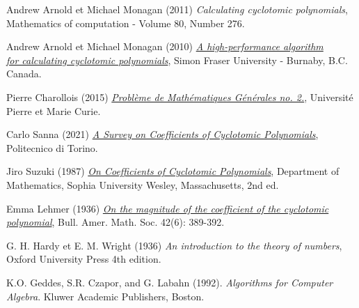 \documentclass{article}
\theoremstyle{break}                  %
\begin{document}
\begin{thebibliography}{9}
	Andrew Arnold et Michael Monagan (2011)
	\emph{Calculating cyclotomic polynomials}, Mathematics of computation - Volume 80, Number 276.
	
	Andrew Arnold et Michael Monagan (2010) \href{https://wayback.cecm.sfu.ca/~ada26/cyclotomic/PDFs/highperf.pdf}{\emph{A high-performance algorithm\\ for calculating cyclotomic polynomials}}, Simon Fraser University -	Burnaby, B.C. Canada.
	
	Pierre Charollois (2015) \href{https://webusers.imj-prg.fr/~pierre.charollois/Charollois_Pbme_cyclotomiques_agreg2015.pdf}{\emph{Problème de Mathématiques Générales no. 2.}}, Université Pierre et Marie Curie.
	
	Carlo Sanna (2021) \href{https://arxiv.org/pdf/2111.04034}{\emph{A Survey on Coefficients of Cyclotomic Polynomials}}, Politecnico di Torino.
	
	Jiro Suzuki (1987) \href{https://projecteuclid.org/journals/proceedings-of-the-japan-academy-series-a-mathematical-sciences/volume-63/issue-7/On-coefficients-of-cyclotomic-polynomials/10.3792/pjaa.63.279.full}{\emph{On Coefficients of Cyclotomic Polynomials}}, Department of Mathematics, Sophia University
	Wesley, Massachusetts, 2nd ed.
	
	Emma Lehmer (1936) \href{https://projecteuclid.org/journals/bulletin-of-the-american-mathematical-society-new-series/volume-42/issue-6/On-the-magnitude-of-the-coefficients-of-the-cyclotomic-polynomial/bams/1183498920.full}{\emph{On the magnitude of the coefficient of the cyclotomic polynomial}}, Bull. Amer. Math. Soc. 42(6): 389-392.
	
	G. H. Hardy et E. M. Wright (1936)
	\emph{An introduction to the theory of numbers}, Oxford University Press 4th edition.
	
	K.O. Geddes, S.R. Czapor, and G. Labahn (1992).
	\emph{Algorithms for Computer Algebra}. Kluwer Academic Publishers,	Boston.
\end{thebibliography}
\end{document}
